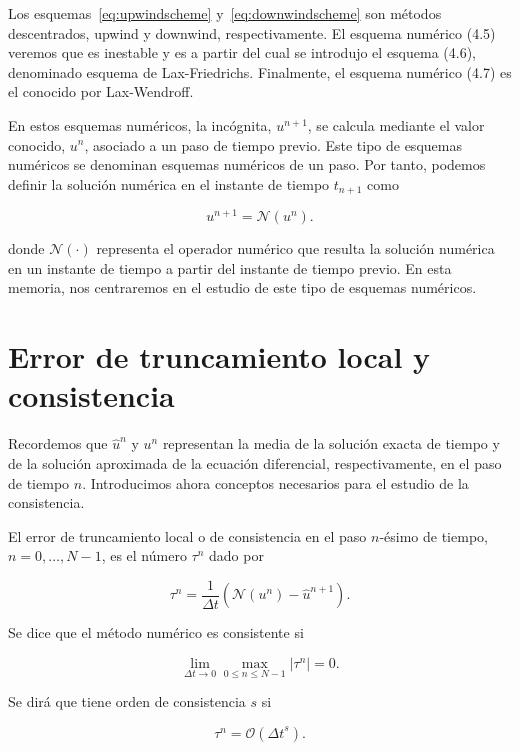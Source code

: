 Los esquemas~\eqref{eq:upwindscheme} y~\eqref{eq:downwindscheme} son métodos descentrados, upwind y
downwind, respectivamente.
El esquema numérico (4.5) veremos que es inestable y es a partir del
cual se introdujo el esquema (4.6), denominado esquema de
Lax-Friedrichs.
Finalmente, el esquema numérico (4.7) es el conocido por
Lax-Wendroff.

En estos esquemas numéricos, la incógnita, $u^{n+1}$, se calcula
mediante el valor conocido, $u^{n}$, asociado a un paso de tiempo
previo.
Este tipo de esquemas numéricos se denominan esquemas numéricos de un
paso.
Por tanto, podemos definir la solución numérica en el instante de
tiempo $t_{n+1}$ como

\begin{equation*}
  u^{n+1}=
  \mathcal{N}\left(u^{n}\right).
\end{equation*}

donde $\mathcal{N}\left(\cdot\right)$ representa el operador numérico
que resulta la solución numérica en un instante de tiempo a partir
del instante de tiempo previo.
En esta memoria, nos centraremos en el estudio de este tipo de
esquemas numéricos.

\section{Error de truncamiento local y consistencia}

Recordemos que $\widehat{u}^{n}$ y $u^{n}$ representan la media de la
solución exacta de tiempo y de la solución aproximada de la ecuación
diferencial, respectivamente, en el paso de tiempo $n$.
Introducimos ahora conceptos necesarios para el estudio de la
consistencia.

\begin{definition}
  El error de truncamiento local o de consistencia en el paso
  $n$-ésimo de tiempo, $n=0,\dotsc,N-1$, es el número $\tau^{n}$ dado
  por

  \begin{equation*}
    \tau^{n}=
    \frac{1}{\Delta t}
    \left(
    \mathcal{N}\left(u^{n}\right)-
    \widehat{u}^{n+1}
    \right).
  \end{equation*}
\end{definition}

\begin{definition}
  Se dice que el método numérico es consistente si

  \begin{equation*}
    \lim_{\Delta t\to0}
    \max_{0\leq n\leq N-1}
    \left|\tau^{n}\right|
    =0.
  \end{equation*}

  Se dirá que tiene orden de consistencia $s$ si

  \begin{equation*}
    \tau^{n}=
    \mathcal{O}
    \left({\Delta t}^{s}\right).
  \end{equation*}
\end{definition}


